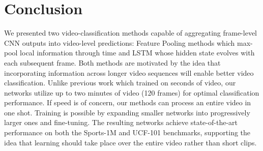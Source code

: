 \documentclass[10pt,twocolumn,letterpaper]{article}
\begin{document}
\begin{table}[t]
\begin{center}
\end{center}
\vspace{-1em}
\caption{UCF-101 results. The bold-face numbers represent results that are higher than previously reported results.}
\label{table:optical_flow_results}
\vspace{-2em}
\end{table}


 
\section{Conclusion}
\vspace{-1em}
We presented two video-classification methods capable of
aggregating frame-level CNN outputs into video-level predictions:
Feature Pooling methods which max-pool local information through time
and LSTM whose hidden state evolves with each subsequent frame. Both
methods are motivated by the idea that incorporating information across
longer video sequences will enable better video classification. Unlike
previous work which trained on seconds of video, our networks utilize
up to two minutes of video (120 frames) for optimal classification performance.
If speed is of concern, our methods can process an entire video in one shot.
Training is possible by expanding smaller networks into progressively larger
ones and fine-tuning. The resulting networks
achieve state-of-the-art performance on both the Sports-1M and UCF-101
benchmarks, supporting the idea that learning should take place over the entire
video rather than short clips.
\end{document}
